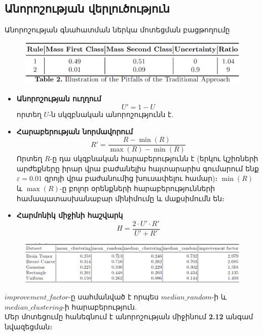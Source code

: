 \documentclass[aspectratio=169]{beamer}
\begin{document}
\subsection{Անորոշության վերլուծություն}
\begin{frame}{{\rm Անորոշության գնահատման ներկա մոտեցման բացթողումը}}
\begin{figure}
    \centering
    \includegraphics[width=1\linewidth]{../../fig/pitfalls.png}
\end{figure}
\end{frame}

\begin{frame}
\begin{itemize}
\item \textbf{Անորոշության ուղղում}
    \[
    U' = 1 - U
    \]
    որտեղ \( U \)-ն սկզբնական անորոշությունն է.
    \pause
    \item \textbf{Հարաբերության նորմավորում}
    \[
    R' = \frac{R - \min(R)}{\max(R) - \min(R)}
    \]
    Որտեղ \( R \)-ը դա սկզբնական հարաբերությունն է (երկու կշիռների արժեքները իրար վրա բաժանելիս հայտարարիս գումարում ենք $\varepsilon=0.01$ զրոյի վրա բաժանումից խուսափելու համար)։ \( \min(R) \) և \( \max(R) \)-ը բոլոր օրենքների հարաբերությունների համապատասխանաբար մինիմումը և մաքսիմումն են։
    \pause
    \item \textbf{Հարմոնիկ միջինի հաշվարկ}
    \[
    H = \frac{2 \cdot U' \cdot R'}{U' + R'}
    \]
     
\end{itemize}
\end{frame}

\begin{frame}
\begin{figure}
    \centering
    \includegraphics[width=1\linewidth]{unc_df.png}
\end{figure}
{\rm $improvement\_factor$}-ը սահմանված է որպես $median\_random$-ի և $median\_clustering$-ի հարաբերություն. \\ \pause
Մեր մոտեցումը հանեգնում է  անորոշության միջինում \textbf{2.12} անգամ նվազեցման։
    
\end{frame}
\end{document}
